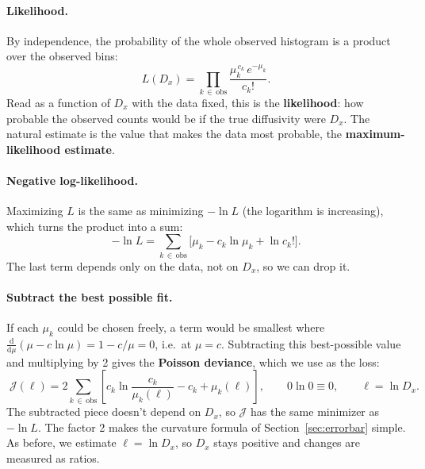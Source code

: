 \documentclass[11pt]{article}
\newcommand{\J}{\mathcal{J}}
\newcommand{\dd}{\mathrm{d}}
\begin{document}
\paragraph{Likelihood.} By independence, the probability of the whole observed histogram is a product over the observed bins:
\[
L(D_x) = \prod_{k\,\in\,\mathrm{obs}}\frac{\mu_k^{\,c_k}\,e^{-\mu_k}}{c_k!}.
\]
Read as a function of $D_x$ with the data fixed, this is the \textbf{likelihood}: how probable the observed counts would be if the true diffusivity were $D_x$. The natural estimate is the value that makes the data most probable, the \textbf{maximum-likelihood estimate}.

\paragraph{Negative log-likelihood.} Maximizing $L$ is the same as minimizing $-\ln L$ (the logarithm is increasing), which turns the product into a sum:
\[
-\ln L = \sum_{k\,\in\,\mathrm{obs}}\bigl[\mu_k - c_k\ln\mu_k + \ln c_k!\bigr].
\]
The last term depends only on the data, not on $D_x$, so we can drop it.

\paragraph{Subtract the best possible fit.} If each $\mu_k$ could be chosen freely, a term would be smallest where $\frac{\dd}{\dd\mu}(\mu - c\ln\mu) = 1 - c/\mu = 0$, i.e.\ at $\mu = c$. Subtracting this best-possible value and multiplying by 2 gives the \textbf{Poisson deviance}, which we use as the loss:
\begin{equation}\label{eq:dev}
\boxed{\;\J(\ell) = 2\sum_{k\,\in\,\mathrm{obs}}\left[c_k\ln\frac{c_k}{\mu_k(\ell)} - c_k + \mu_k(\ell)\right],\qquad 0\ln0\equiv0,\qquad \ell = \ln D_x.\;}
\end{equation}
The subtracted piece doesn't depend on $D_x$, so $\J$ has the same minimizer as $-\ln L$. The factor 2 makes the curvature formula of Section~\ref{sec:errorbar} simple. As before, we estimate $\ell = \ln D_x$, so $D_x$ stays positive and changes are measured as ratios.
\end{document}
